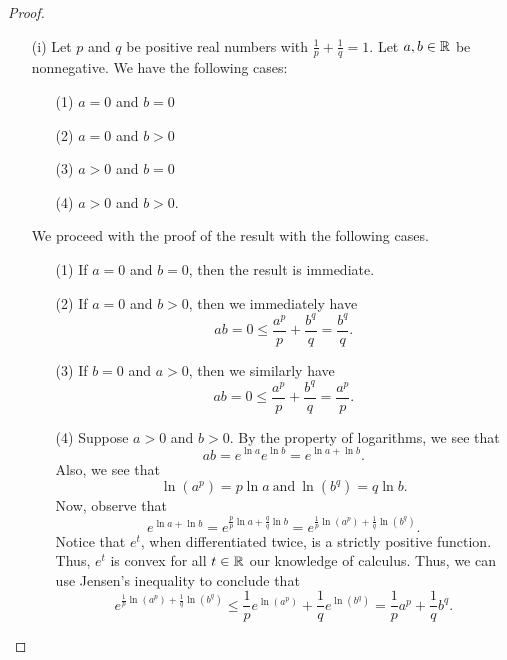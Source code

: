 \documentclass[a4paper]{article}
\begin{document}
\begin{proof}
\begin{enumerate}
    \item[(i)] Let \( p  \) and \( q  \) be positive real numbers with \( \frac{ 1 }{ p }  + \frac{ 1 }{ q }  = 1  \). Let \( a,b \in \mathbb{R}  \) be nonnegative. We have the following cases:  
            \begin{enumerate}
                \item[(1)] \( a = 0  \) and \( b = 0  \)
                \item[(2)] \( a = 0  \) and \( b > 0  \)
                \item[(3)] \( a > 0  \) and \( b = 0  \)
                \item[(4)] \( a > 0  \) and \( b > 0  \).
            \end{enumerate}
            We proceed with the proof of the result with the following cases.
            \begin{enumerate}
                \item[(1)] If \( a = 0  \) and \( b = 0  \), then the result is immediate. 
                \item[(2)] If \( a = 0  \) and \(  b > 0  \), then we immediately have  
                    \[  ab = 0 \leq \frac{ a^{p} }{ p  } + \frac{ b^{q} }{ q }  = \frac{ b^{q} }{ q }. \]
                \item[(3)] If \( b = 0  \) and \( a > 0  \), then we similarly have
                    \[  ab = 0 \leq \frac{ a^{p} }{ p  } + \frac{ b^{q} }{ q }  = \frac{ a^{p} }{ p }. \]
                \item[(4)] Suppose \(  a > 0  \) and \( b > 0  \). By the property of logarithms, we see that
                    \[  ab = e^{\ln a } e^{\ln b} = e^{\ln a + \ln b}. \]
                Also, we see that 
                \[  \ln(a^{p}) = p \ln a \ \text{and} \ \ln(b^{q})=  q \ln b.  \]
                Now, observe that 
                \[  e^{\ln a + \ln b} = e^{\frac{ p }{ p } \ln a  + \frac{ q }{ q }  \ln b } = e^{\frac{ 1 }{ p }  \ln (a^{p}) + \frac{ 1 }{ q }  \ln(b^{q})}.    \]
                Notice that \( e^{t} \), when differentiated twice, is a strictly positive function. Thus, \( e^{t} \) is convex for all \( t \in \mathbb{R}  \) our knowledge of calculus. Thus, we can use Jensen's inequality to conclude that
                \[  e^{\frac{ 1 }{ p }  \ln (a^{p}) + \frac{ 1 }{ q }  \ln (b^{q})} \leq   \frac{ 1 }{ p } e^{  \ln (a^{p})} + \frac{ 1 }{ q }  e^{\ln (b^{q})}  = \frac{ 1 }{ p }  a^{p} + \frac{ 1 }{ q }  b^{q}. \]

\end{enumerate}
\end{enumerate}
\end{proof}
\end{document}
